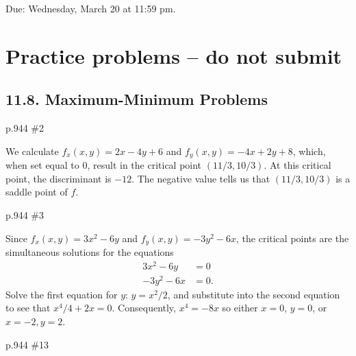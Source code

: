 \maketitle

Due: Wednesday, March 20 at 11:59 pm.

\section{Practice problems -- do not submit}
\subsection{11.8. Maximum-Minimum Problems}
\begin{practice}p.944 \#2\end{practice}
\begin{pracsol}
  We calculate $f_x(x,y)=2x-4y+6$ and $f_y(x,y)=-4x+2y+8$, which, when set equal to 0, result in the critical point $(11/3,10/3)$. At this critical point, the discriminant is $-12$. The negative value tells us that $(11/3,10/3)$ is a saddle point of $f$.
\end{pracsol}
\begin{practice}p.944 \#3\end{practice}
\begin{pracsol}
  Since $f_x(x,y)=3x^2-6y$ and $f_y(x,y)=-3y^2-6x$, the critical points are the simultaneous solutions for the equations
  \begin{align*}
    3x^2-6y &= 0\\
    -3y^2-6x&=0.
  \end{align*}
  Solve the first equation for $y$: $y=x^2/2$, and substitute into the second equation to see that $x^4/4+2x=0$. Consequently, $x^4=-8x$ so either $x=0$, $y=0$, or $x=-2,y=2$.
\end{pracsol}
\begin{practice}p.944 \#13\end{practice}
